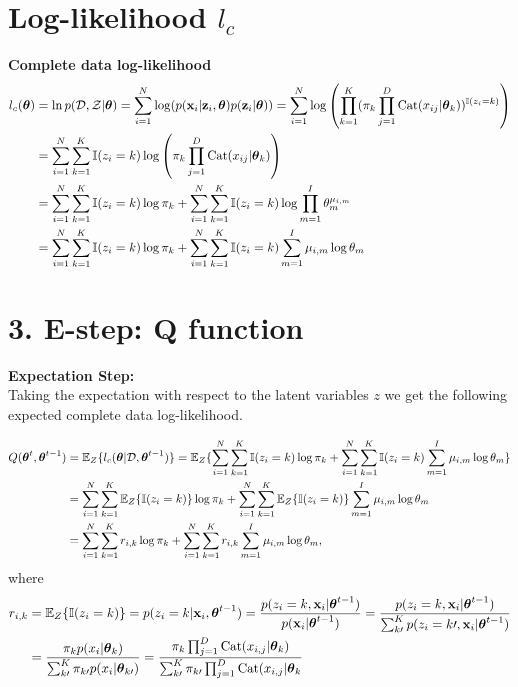 \documentclass[12pt]{article}
\begin{document}
\section{Log-likelihood $l_c$}
\textbf{Complete data log-likelihood}
\begin{align}
    l_c(\boldsymbol\theta) & = \ln p(\mathcal{D},\mathcal{Z}|\boldsymbol\theta) = \sum_{i=1}^{N}\log (p(\mathbf{x}_i|\mathbf{z}_i,\boldsymbol\theta) p(\mathbf{z}_i|\boldsymbol\theta)) =  \sum_{i=1}^{N}\log \left(\prod_{k=1}^K(\pi_k\prod_{j=1}^D \operatorname{\mathrm{Cat}}(x_{ij}|\boldsymbol\theta_k))^{\mathbb{I} (z_i=k)}\right)\\
    & = \sum_{i=1}^N\sum_{k=1}^K\mathbb{I} (z_i=k) \log\left( \pi_k\prod_{j=1}^D\operatorname{\mathrm{Cat}}(x_{ij}|\boldsymbol\theta_k)\right) \\
    & =  \sum_{i=1}^N\sum_{k=1}^K\mathbb{I} (z_i=k) \log \pi_k + \sum_{i=1}^N\sum_{k=1}^K\mathbb{I} (z_i=k) \log \prod_{m=1}^I \theta_m^{\mu_{i,m}}\\
    & = \sum_{i=1}^N\sum_{k=1}^K\mathbb{I} (z_i=k) \log \pi_k + \sum_{i=1}^N\sum_{k=1}^K\mathbb{I} (z_i=k) \sum_{m=1}^I \mu_{i,m}\log \theta_m
    \end{align}
    
   
\section{3. E-step: Q function}
\textbf{Expectation Step: }\\

Taking the expectation with respect to the latent variables $z$ we get the following expected complete data log-likelihood.

\begin{align}
    Q(\boldsymbol\theta^t, \boldsymbol\theta^{t-1}) & = \mathbb{E}_Z\{l_c(\boldsymbol\theta|\mathcal{D},\boldsymbol\theta^{t-1})\} = \mathbb{E}_Z\{\sum_{i=1}^N\sum_{k=1}^K\mathbb{I} (z_i=k) \log \pi_k + \sum_{i=1}^N\sum_{k=1}^K\mathbb{I} (z_i=k) \sum_{m=1}^I \mu_{i,m}\log \theta_m\}\\
    & = \sum_{i=1}^N\sum_{k=1}^K\mathbb{E}_Z\{\mathbb{I} (z_i=k)\} \log \pi_k + \sum_{i=1}^N\sum_{k=1}^K\mathbb{E}_Z\{\mathbb{I}(z_i=k)\} \sum_{m=1}^I \mu_{i,m}\log \theta_m\\
    & = \sum_{i=1}^N\sum_{k=1}^K r_{i,k}\log \pi_k + \sum_{i=1}^N\sum_{k=1}^K r_{i,k}\sum_{m=1}^I \mu_{i,m}\log \theta_m ,
\end{align}
where 
\begin{align}
	r_{i,k} &= \mathbb{E}_Z\{ \mathbb{I}(z_i=k) \} = p(z_i = k|\mathbf{x}_i,\boldsymbol\theta^{t-1}) = \frac{p(z_i=k,\mathbf{x}_i|\boldsymbol\theta^{t-1})}{p(\mathbf{x}_i|\boldsymbol\theta^{t-1})} = \frac{p(z_i=k,\mathbf{x}_i|\boldsymbol\theta^{t-1})}{\sum_{k\prime}^{K}p(z_i=k\prime,\mathbf{x}_i|\boldsymbol\theta^{t-1})}\\
	& = \frac{\pi_k p(x_i|\boldsymbol\theta_k)}{\sum_{k\prime}^K \pi_{k\prime} p(x_i|\boldsymbol\theta_{k\prime})} =
	\frac{\pi_k\prod_{j=1}^{D}\operatorname{\mathrm{Cat}}(x_{i,j}|\boldsymbol\theta_k)}{\sum_{k\prime}^{K} \pi_{k\prime} \prod_{j=1}^{D}\operatorname{\mathrm{Cat}}(x_{i,j}|\boldsymbol\theta_k}
\end{align}
\end{document}
